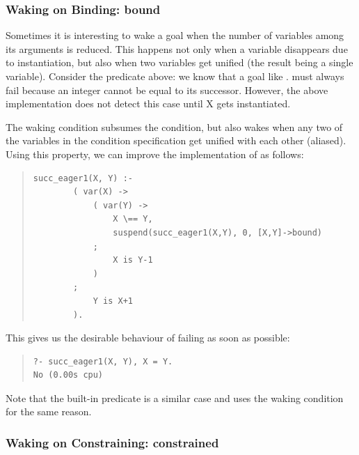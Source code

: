 {%
\subsubsection{Waking on Binding: bound}

Sometimes it is interesting to wake a goal when the number of variables
among its arguments is reduced. This happens not only when a variable
disappears due to instantiation, but also when two variables get unified
(the result being a single variable). Consider the 
predicate
above: we know that a goal like . must always fail
because an integer cannot be equal to its successor. However, the above
implementation does not detect this case until X gets instantiated.

The  waking condition subsumes the  condition,
but
also wakes when any two of the variables in the condition specification get
unified with each other (aliased).
Using this property, we can improve the implementation of
as follows:
\begin{quote}
\begin{verbatim}
succ_eager1(X, Y) :-
        ( var(X) ->
            ( var(Y) ->
                X \== Y,
                suspend(succ_eager1(X,Y), 0, [X,Y]->bound)
            ;
                X is Y-1
            )
        ;
            Y is X+1
        ).
\end{verbatim}
\end{quote}
This gives us the desirable behaviour of failing as soon as possible:
\begin{quote}
\begin{verbatim}
?- succ_eager1(X, Y), X = Y.
No (0.00s cpu)
\end{verbatim}
\end{quote}
Note that the built-in predicate
is a similar case and uses the  waking condition for the
same reason.



\subsubsection{Waking on Constraining: constrained}

}
